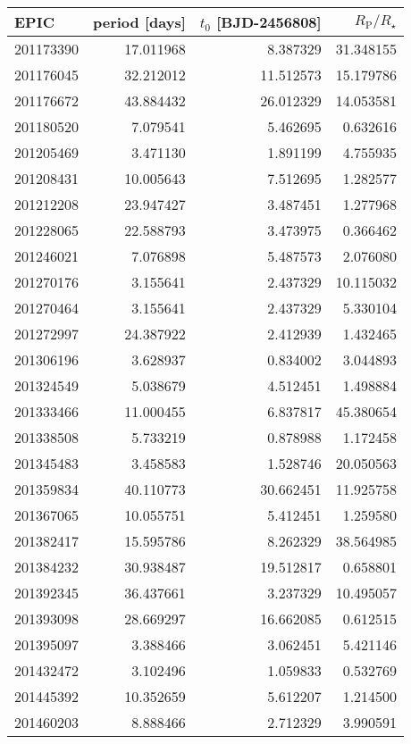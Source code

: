 \begin{tabular}{lrrr}
\toprule
EPIC &  period [days] & $t_0$ [BJD-2456808] & $R_\mathrm{P} / R_\star$ \\
\midrule
201173390 &  17.011968 &   8.387329 &  31.348155 \\
201176045 &  32.212012 &  11.512573 &  15.179786 \\
201176672 &  43.884432 &  26.012329 &  14.053581 \\
201180520 &   7.079541 &   5.462695 &   0.632616 \\
201205469 &   3.471130 &   1.891199 &   4.755935 \\
201208431 &  10.005643 &   7.512695 &   1.282577 \\
201212208 &  23.947427 &   3.487451 &   1.277968 \\
201228065 &  22.588793 &   3.473975 &   0.366462 \\
201246021 &   7.076898 &   5.487573 &   2.076080 \\
201270176 &   3.155641 &   2.437329 &  10.115032 \\
201270464 &   3.155641 &   2.437329 &   5.330104 \\
201272997 &  24.387922 &   2.412939 &   1.432465 \\
201306196 &   3.628937 &   0.834002 &   3.044893 \\
201324549 &   5.038679 &   4.512451 &   1.498884 \\
201333466 &  11.000455 &   6.837817 &  45.380654 \\
201338508 &   5.733219 &   0.878988 &   1.172458 \\
201345483 &   3.458583 &   1.528746 &  20.050563 \\
201359834 &  40.110773 &  30.662451 &  11.925758 \\
201367065 &  10.055751 &   5.412451 &   1.259580 \\
201382417 &  15.595786 &   8.262329 &  38.564985 \\
201384232 &  30.938487 &  19.512817 &   0.658801 \\
201392345 &  36.437661 &   3.237329 &  10.495057 \\
201393098 &  28.669297 &  16.662085 &   0.612515 \\
201395097 &   3.388466 &   3.062451 &   5.421146 \\
201432472 &   3.102496 &   1.059833 &   0.532769 \\
201445392 &  10.352659 &   5.612207 &   1.214500 \\
201460203 &   8.888466 &   2.712329 &   3.990591 \\

\end{tabular}

